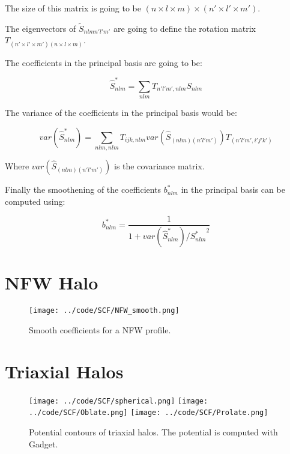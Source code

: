 \documentclass[12pt]{article}
\begin{document}
The size of this matrix is going to be $(n\times l \times m)\times( n' \times l'
\times m')$.

The eigenvectors of $\tilde{S}_{nlm n'l'm'}$ are going to define the
rotation matrix $T_{(n' \times l' \times m')(n \times l \times m)}$.

The coefficients in the principal basis are going to be:

\begin{equation}
\hat{S}^{*}_{nlm} = \sum_{nlm} T_{n'l'm',nlm} S_{nlm}
\end{equation}

The variance of the coefficients in the principal basis would be:

\begin{equation}
var(\hat{S}^{*}_{nlm}) = \sum_{nlm,nlm} T_{ijk,nlm}
var(\hat{S}_{(nlm)(n'l'm')}) T_{(n'l'm',i'j'k')}
\end{equation}

Where $var(\hat{S}_{(nlm)(n'l'm')})$ is the covariance matrix.

Finally the smoothening of the coefficients $b^*_{nlm}$ in the
principal basis can be computed using:

\begin{equation}
b^*_{nlm} = \dfrac{1}{1 + var(\hat{S}^*_{nlm})/{S^*_{nlm}}^2}
\end{equation}

\section{NFW Halo}

\begin{figure}[H]
\centering
\texttt{[image: ../code/SCF/NFW\_smooth.png]}
\caption{Smooth coefficients for a NFW profile.}
\end{figure}

\section{Triaxial Halos}

\begin{figure}[H]
\centering
{}
\texttt{[image: ../code/SCF/spherical.png]}
\endminipage
{}
\texttt{[image: ../code/SCF/Oblate.png]}
\endminipage
{}
\texttt{[image: ../code/SCF/Prolate.png]}
\endminipage
\caption{Potential contours of triaxial halos. The potential is
computed with Gadget.\label{fig:coeffMW}}
\end{figure}
\end{document}
